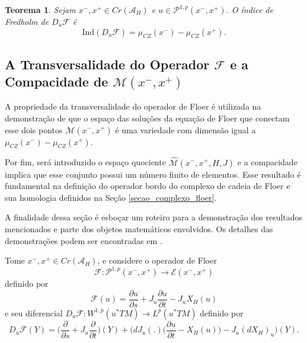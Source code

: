 \documentclass[12pt]{book}
\newtheorem{teorema}{Teorema}[section]
\newcommand{\bigparenteses}[1]{\Big( #1 \Big) }
\newcommand{\caminhosexponenciaisconectantes}[2]{\mathcal{P}^{1,p}(#1, #2)}
\newcommand{\caminhosexponenciaisconectantespadrao}{\caminhosexponenciaisconectantes{x^{-}}{x^{+}}}
\newcommand{\diferencialfloerponto}[1]{D_{#1}\operadorFloer}
\newcommand{\derivadaparcial}[2]{\frac{\partial #1}{\partial #2}}
\newcommand{\diferencialhamiltoniano}[1]{(dX_{H})_{#1}}
\newcommand{\energiafinitaM}{\mathcal{M}}
\newcommand{\energiafinitaMconectante}{\energiafinitaM(x^{-}, x^{+})}
\newcommand{\espacoLp}[1]{L^{p}(#1)}
\newcommand{\espacosobolev}[1]{W^{1,p}(#1)}
\newcommand{\fibradocaminhosexponenciais}{\mathcal{E}(x^{-}, x^{+})}
\newcommand{\funcionalH}{\mathcal{A}_{H}}
\newcommand{\iconley}[1]{\iconleyabrev(#1)}
\newcommand{\iconleyabrev}{\mu_{CZ}}
\newcommand{\ind}{\text{Ind}}
\newcommand{\operadorFloer}{\mathcal{F}}
\newcommand{\operadorFloerDefinicao}[1]{\derivadaparcial{#1}{s} + J_{#1}\derivadaparcial{#1}{t} - J_{#1}X_{H}(#1)}
\newcommand{\operadorFloerParametro}[1]{\mathcal{F}(#1)}
\newcommand{\pontoscriticos}[1]{\textit{Cr}(#1)}
\newcommand{\pullbackfibradotangente}[2]{#1^{*}T#2}
\newcommand{\pullbackfibradotangenteM}[1]{\pullbackfibradotangente{#1}{M}}
\newcommand{\quocientetrajetorias}{\widehat{\energiafinitaM}(x^{-}, x^{+}, H, J)}
\begin{document}
	\begin{teorema}\label{teorema_indice_diferencial_operador_floer}
		Sejam $ x^{-}, x^{+} \in \pontoscriticos{\funcionalH}$ e $u\in \caminhosexponenciaisconectantespadrao$. O índice de Fredholm de $\diferencialfloerponto{u}$ é
		$$
		\ind(\diferencialfloerponto{u}) = \iconley{x^{-}}-\iconley{x^{+}}.
		$$
	\end{teorema}
	
	\subsection{A Transversalidade do Operador $\operadorFloer$ e a Compacidade de $\energiafinitaMconectante$}\label{secao_transversalidade_compacidade_M}
	
	A propriedade da transversalidade do operador de Floer é utilizada na demonstração de que o espaço das soluções da equação de Floer que conectam esse dois pontos $\energiafinitaMconectante$ é uma variedade com dimensão igual a $\iconley{x^{-}}-\iconley{x^{+}}$.
	
	Por fim, será introduzido o espaço quociente $\quocientetrajetorias$ e a compacidade implica que esse conjunto possui um número finito de elementos. Esse resultado é fundamental na definição do operador bordo do complexo de cadeia de Floer e sua homologia definidos na Seção \ref{secao_complexo_floer}.
	
	A finalidade dessa seção é esboçar um roteiro para a demonstração dos resultados mencionados e parte dos objetos matemáticos envolvidos. Os detalhes das demonstrações podem ser encontradas em \cite{audi_floer_homology}.
	
	Tome $x^{-},x^{+}\in \pontoscriticos{\funcionalH}$, e considere o operador de Floer 
	$$
	\operadorFloer: \caminhosexponenciaisconectantespadrao \to \fibradocaminhosexponenciais
	$$  
	definido por
	$$
	\operadorFloerParametro{u} =\operadorFloerDefinicao{u}
	$$
	e seu diferencial $\diferencialfloerponto{u}: \espacosobolev{\pullbackfibradotangenteM{u}} \to \espacoLp{\pullbackfibradotangenteM{u}}$ definido por
	$$
	\diferencialfloerponto{u}(Y)= \Big( \derivadaparcial{}{s} + J_{u}\derivadaparcial {}{t}\Big)(Y)+ \Big(dJ_{u}(.)\bigparenteses{\derivadaparcial{u}{t} - X_{H}(u)} - J_{u} \diferencialhamiltoniano{u}\Big)(Y).
	$$
	
\end{document}
